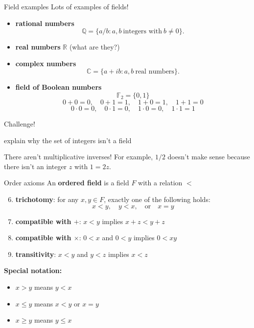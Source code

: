 \documentclass{beamer}
\begin{document}
\begin{frame}{Field examples}
Lots of examples of fields!
\begin{itemize}
\pause
\item \textbf{rational numbers}
$$\mathbb{Q} = \{ a/b: a,b\ \text{integers with}\ b\neq 0\}.$$
\pause
\item \textbf{real numbers} $\mathbb{R}$ (what are they?)
\pause
\item \textbf{complex numbers}
$$\mathbb{C} = \{ a + ib: a,b\ \text{real numbers}\}.$$
\pause
\item \textbf{field of Boolean numbers}
$$\mathbb{F}_2 = \{0,1\}$$
$$0+0 = 0,\quad 0+1 = 1,\quad 1+0 = 1,\quad 1+1 = 0$$
$$0\cdot 0 = 0,\quad 0\cdot1 = 0,\quad 1\cdot0 = 0,\quad 1\cdot1 = 1$$
\end{itemize}
\end{frame}

\begin{frame}{Challenge!}
\begin{prob}
explain why the set of integers isn't a field
\end{prob}
\pause
\begin{soln}
There aren't multiplicative inverses!
\pause
For example, $1/2$ doesn't make sense because there isn't an integer $z$ with $1=2z$.
\end{soln}
\end{frame}

\begin{frame}{Order axioms}
An \textbf{ordered field} is a field $F$ with a relation $<$ 
\begin{enumerate}[\text{A}1]
\setcounter{enumi}{5}
\pause
\item \textbf{trichotomy}: for any $x,y\in F$, exactly one of the following holds:
$$x < y,\quad y < x,\quad\text{or}\quad x = y$$
\pause
\item \textbf{compatible with $+$}: $x < y$ implies $x+z < y+z$
\pause
\item \textbf{compatible with $\times$}: $0 < x$ and $0 < y$ implies $0 < xy$
\pause
\item \textbf{transitivity}: $x < y$ and $y < z$ implies $x < z$
\end{enumerate}
\pause
\textbf{Special notation:}
\begin{itemize}
\item $x > y$ means $y < x$
\item $x \leq y$ means $x < y$ or $x=y$
\item $x \geq y$ means $y \leq x$
\end{itemize}
\end{frame}
\end{document}

